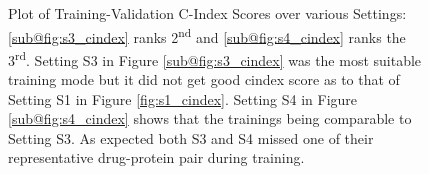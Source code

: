 \begin{figure} \centering
    \qquad
    \qquad
    \caption[Concordance Score during Training(b)]{ Plot of Training-Validation C-Index Scores over various Settings: \ref{sub@fig:s3_cindex} ranks 2\textsuperscript{nd} and \ref{sub@fig:s4_cindex} ranks the 3\textsuperscript{rd}. Setting S3 in Figure \ref{sub@fig:s3_cindex} was the most suitable training mode but it did not get good cindex score as to that of Setting S1 in Figure \ref{fig:s1_cindex}. Setting S4 in Figure \ref{sub@fig:s4_cindex} shows that the trainings being comparable to Setting S3. As expected both S3 and S4 missed one of their representative drug-protein pair during training.
    }
    \label{fig:ci_curve_2}
\end{figure}   

